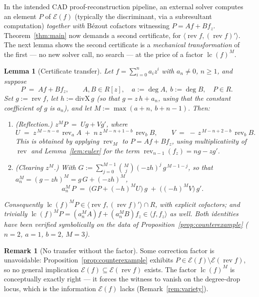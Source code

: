 \documentclass[11pt,a4paper]{article}
\newtheorem{lemma}[theorem]{Lemma}
\theoremstyle{definition}
\newtheorem{remark}[theorem]{Remark}
\newcommand{\lc}{\operatorname{lc}}
\newcommand{\rev}{\operatorname{rev}}
\newcommand{\E}{\mathcal{E}}
\newcommand{\ideal}[1]{\langle #1\rangle}
\begin{document}
In the intended CAD proof-reconstruction pipeline, an external solver computes
an element $P$ of $\E(f)$ (typically the discriminant, via a subresultant
computation) \emph{together with} B\'ezout cofactors witnessing
$P = A f + B f_z$. Theorem~\ref{thm:main} now demands a second certificate,
for $\ideal{\rev f, (\rev f)'}$. The next lemma shows the second certificate
is a \emph{mechanical transformation} of the first --- no new solver call, no
search --- at the price of a factor $\lc(f)^M$.

\begin{lemma}[Certificate transfer]\label{lem:cert}
Let $f = \sum_{i=0}^n a_i z^i$ with $a_n \neq 0$, $n \ge 1$, and suppose
\[
  P \;=\; A f + B f_z, \qquad A, B \in R[z],\quad
  a := \deg A,\ b := \deg B,\quad P \in R .
\]
Set $g := \rev f$, let $h := \mathrm{divX}\, g$ (so that $g = z\,h + a_n$,
using that the constant coefficient of $g$ is $a_n$), and let
$M := \max(a+n,\ b+n-1)$. Then:
\begin{enumerate}[label=(\roman*)]
\item \emph{(Reflection.)}
  $\displaystyle z^M P \;=\; U g + V g'$, where
  \[
    U \;=\; z^{\,M-n-a}\,\rev_a A \;+\; n\, z^{\,M-n+1-b}\,\rev_b B,
    \qquad
    V \;=\; -\,z^{\,M-n+2-b}\,\rev_b B .
  \]
  This is obtained by applying $\rev_M$ to $P = Af + Bf_z$, using
  multiplicativity of $\rev$ and Lemma~\ref{lem:euler} for the term
  $\rev_{n-1}(f_z) = n g - z g'$.
\item \emph{(Clearing $z^M$.)} With
  $G := \sum_{j=0}^{M-1}\binom{M}{j}(-zh)^j\, g^{\,M-1-j}$, so that
  $a_n^M = (g - zh)^M = g\,G + (-zh)^M$,
  \[
    a_n^M\, P \;=\;
      \bigl(G P + (-h)^M U\bigr)\, g \;+\; \bigl((-h)^M V\bigr)\, g' .
  \]
\end{enumerate}
Consequently $\lc(f)^M P \in \ideal{\rev f, (\rev f)'} \cap R$, with explicit
cofactors; and trivially $\lc(f)^M P = (a_n^M A) f + (a_n^M B) f_z \in
\ideal{f, f_z}$ as well. Both identities have been verified symbolically on
the data of Proposition~\ref{prop:counterexample}
($n = 2$, $a = 1$, $b = 2$, $M = 3$).
\end{lemma}

\begin{remark}[No transfer without the factor]
Some correction factor is unavoidable: Proposition~\ref{prop:counterexample}
exhibits $P \in \E(f) \setminus \E(\rev f)$, so no general implication
$\E(f) \subseteq \E(\rev f)$ exists. The factor $\lc(f)^M$ is conceptually
exactly right --- it forces the witness to vanish on the degree-drop locus,
which is the information $\E(f)$ lacks (Remark~\ref{rem:variety}).
\end{remark}
\end{document}
